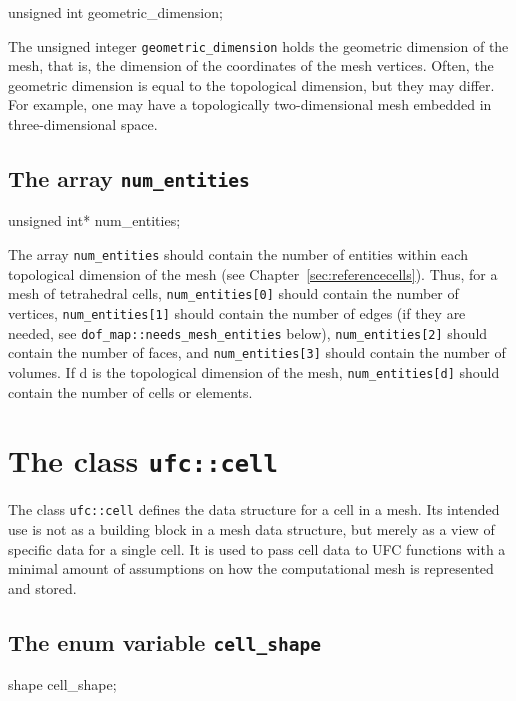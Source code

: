 \begin{code}
unsigned int geometric_dimension;
\end{code}

The unsigned integer \texttt{geometric\_dimension} holds the geometric
dimension of the mesh, that is, the dimension of the coordinates of
the mesh vertices.  Often, the geometric dimension is equal to the
topological dimension, but they may differ. For example, one may have
a topologically two-dimensional mesh embedded in three-dimensional
space.

\subsection{The array \texttt{num\_entities}}

\begin{code}
unsigned int* num_entities;
\end{code}

The array \texttt{num\_entities} should contain the number of entities
within each topological dimension of the mesh (see
Chapter~\ref{sec:referencecells}). Thus, for a mesh of tetrahedral
cells, \texttt{num\_entities[0]} should contain the number of
vertices, \texttt{num\_entities[1]} should contain the number of edges
(if they are needed, see \texttt{dof\_map::needs\_mesh\_entities} below),
\texttt{num\_entities[2]} should contain the number of faces,
and \texttt{num\_entities[3]} should contain the number of volumes.
If d is the topological dimension of the mesh,
\texttt{num\_entities[d]} should contain the number of cells or elements.


\section{The class \texttt{ufc::cell}}

The class \texttt{ufc::cell} defines the data structure for a cell in
a mesh. Its intended use is not as a building block in a mesh data
structure, but merely as a view of specific data for a single cell.
It is used to pass cell data to UFC functions with a minimal amount of
assumptions on how the computational mesh is represented and stored.

\subsection{The enum variable \texttt{cell\_shape}}

\begin{code}
shape cell_shape;
\end{code}

